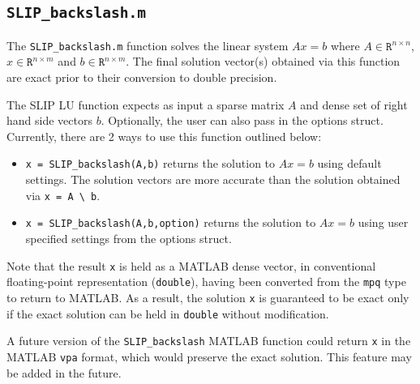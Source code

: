 \documentclass[12pt]{article}
\theoremstyle{definition}
\begin{document}
\cprotect\subsection{\verb|SLIP_backslash.m|}
\label{s:Use:MATLAB:factor}

The \verb|SLIP_backslash.m| function solves the linear system $A x = b$ where
$A \in \mathtt{R}^{n \times n}$, $x \in \mathtt{R}^{n \times m}$ and $b \in
\mathtt{R}^{n \times m}$. The final solution vector(s) obtained via this
function are exact prior to their conversion to double precision.

The SLIP LU function expects as input a sparse matrix $A$ and dense set of
right hand side vectors $b$. Optionally, the user can also pass in the options
struct. Currently, there are 2 ways to use this function outlined below:

\begin{itemize}

\item \verb|x = SLIP_backslash(A,b)| returns the solution to $A x =
b$ using default settings. The solution vectors are more accurate than
the solution obtained via \verb|x = A \ b|.

\item \verb|x = SLIP_backslash(A,b,option)| returns the solution to $A x =
b$ using user specified settings from the options struct.

\end{itemize}

Note that the result \verb|x| is held as a MATLAB dense vector, in conventional
floating-point representation (\verb|double|), having been converted from the
\verb|mpq| type to return to MATLAB.  As a result, the solution \verb|x| is
guaranteed to be exact only if the exact solution can be held in \verb|double|
without modification.

A future version of the \verb|SLIP_backslash| MATLAB function could return
\verb|x| in the MATLAB \verb|vpa| format, which would preserve the exact
solution.  This feature may be added in the future.


\newpage


\end{document}
